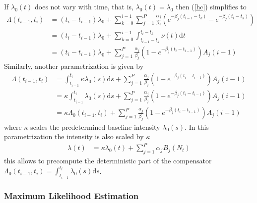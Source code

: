 \documentclass{amsart}
\newcommand{\mathd}{\mathrm{d}}
\begin{document}
If $\lambda_0 ( t)$ does not vary with time, that is, $\lambda_0 ( t) =
\lambda_0$ then (\ref{hc}) simplifies to
\begin{equation}
  \begin{array}{ll}
    \Lambda ( t_{i - 1}, t_i) & = ( t_i - t_{i - 1})^{} \lambda_0 + \sum_{k =
    0}^{i - 1} \sum_{j = 1}^P \frac{\alpha_j}{\beta_j} ( e^{- \beta_j ( t_{i -
    1} - t_k)} - e^{- \beta_j ( t_i - t_k)})\\
    & = ( t_i - t_{i - 1})^{} \lambda_0 + \sum_{k = 0}^{i - 1} \int_{t_{i -
    1} - t_k}^{t_i - t_k} \nu ( t) \mathd t\\
    & = ( t_i - t_{i - 1})^{} \lambda_0 + \sum_{j = 1}^P
    \frac{\alpha_j}{\beta_j} ( 1 - e^{- \beta_j ( t_i - t_{i - 1})}) A_j ( i -
    1)
  \end{array}
\end{equation}
Similarly, another parametrization is given by
\begin{equation}
  \begin{array}{ll}
    \Lambda ( t_{i - 1}, t_i) & = \int_{t_{i - 1}^{}}^{t_i} \kappa \lambda_0 (
    s) \mathd s + \sum_{j = 1}^P \frac{\alpha_j}{\beta_j} ( 1 - e^{- \beta_j (
    t_i - t_{i - 1})}) A_j ( i - 1)\\
    & = \kappa \int_{t_{i - 1}^{}}^{t_i} \lambda_0 ( s) \mathd s + \sum_{j =
    1}^P \frac{\alpha_j}{\beta_j} ( 1 - e^{- \beta_j ( t_i - t_{i - 1})}) A_j
    ( i - 1)\\
    & = \kappa \Lambda_0 ( t_{i - 1}, t_i) + \sum_{j = 1}^P
    \frac{\alpha_j}{\beta_j} ( 1 - e^{- \beta_j ( t_i - t_{i - 1})}) A_j ( i -
    1)
  \end{array} \label{kappa}
\end{equation}
where $\kappa$ scales the predetermined baseline intensity $\lambda_0 ( s)$.
In this parametrization the intensity is also scaled by $\kappa$
\begin{equation}
  \begin{array}{ll}
    \lambda ( t) & = \kappa \lambda_0 ( t) + \sum_{j = 1}^P \alpha_j B_j (
    N_t)
  \end{array}
\end{equation}
this allows to precompute the deterministic part of the compensator $\Lambda_0
( t_{i - 1}, t_i) = \int_{t_{i - 1}^{}}^{t_i} \lambda_0 ( s) \mathd s$.

\subsubsection{Maximum Likelihood Estimation}
\end{document}
